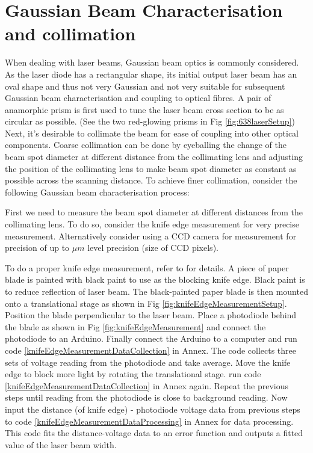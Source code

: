 \documentclass[12pt]{report}
\begin{document}
\section{Gaussian Beam Characterisation and collimation}
When dealing with laser beams, Gaussian beam optics is commonly considered. As the laser diode has a rectangular shape, its initial output laser beam has an oval shape and thus not very Gaussian and not very suitable for subsequent Gaussian beam characterisation and coupling to optical fibres. A pair of anamorphic prism is first used to tune the laser beam cross section to be as circular as possible. (See the two red-glowing prisms in Fig \ref{fig:638laserSetup}) Next, it's desirable to collimate the beam for ease of coupling into other optical components. Coarse collimation can be done by eyeballing the change of the beam spot diameter at different distance from the collimating lens and adjusting the position of the collimating lens to make beam spot diameter as constant as possible across the scanning distance. To achieve finer collimation, consider the following Gaussian beam characterisation process: 
\par
First we need to measure the beam spot diameter at different distances from the collimating lens. To do so, consider the knife edge measurement for very precise measurement. Alternatively consider using a CCD camera for measurement for precision of up to $\mu m$ level precision (size of CCD pixels). 
\par
To do a proper knife edge measurement, refer to \cite{KnifeEdgeMeasurement} for details. A piece of paper blade is painted with black paint to use as the blocking knife edge. Black paint is to reduce reflection of laser beam. The black-painted paper blade is then mounted onto a translational stage as shown in Fig \ref{fig:knifeEdgeMeasurementSetup}. Position the blade perpendicular to the laser beam. Place a photodiode behind the blade as shown in Fig \ref{fig:knifeEdgeMeasurement} and connect the photodiode to an Arduino. Finally connect the Arduino to a computer and run code \ref{knifeEdgeMeasurementDataCollection} in Annex. The code collects three sets of voltage reading from the photodiode and take average. Move the knife edge to block more light by rotating the translational stage. run code \ref{knifeEdgeMeasurementDataCollection} in Annex again. Repeat the previous steps until reading from the photodiode is close to background reading. Now input the distance (of knife edge) - photodiode voltage data from previous steps to code \ref{knifeEdgeMeasurementDataProcessing} in Annex for data processing. This code fits the distance-voltage data to an error function and outputs a fitted value of the laser beam width. 
\end{document}
